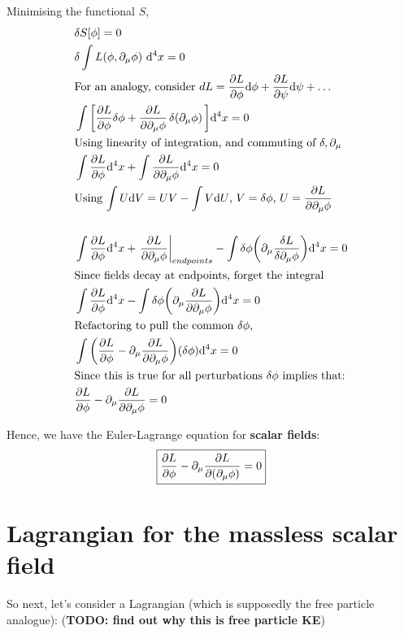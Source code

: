 Minimising the functional $S$,
\begin{align*}
    &\delta S[\phi] = 0 \\
    & \delta \int L(\phi, \partial_\mu \phi)~\dd^4x = 0 \\
    &\text{For an analogy, consider $dL = \pdv{L}{\phi} \dd \phi + \pdv{L}{\psi} \dd \psi + \dots$} \\
    & \int \bigg[\pdv{L}{\phi} \var \phi + 
    \pdv{L}{\partial_\mu \phi} \var (\partial_\mu \phi) \bigg] \dd^4 x  = 0\\
    &\text{Using linearity of integration, and commuting of $\delta, \partial_\mu$}\\
    & \int \pdv{L}{\phi} (\var \phi) \dd^4 x + 
      \int \pdv{L}{\partial_\mu \phi}  (\partial_\mu \var \phi) \dd^4 x = 0 \\
    &\text{Using $\int U \dd V = UV - \int V \dd U$, 
        $V = \delta \phi$, 
    $U = \pdv{L}{\partial_\mu \phi}$ } \\
    \\
    & \int \pdv{L}{\phi} (\var \phi) \dd^4 x + 
       \eval{\pdv{L}{\partial_\mu \phi}  (\var \phi)}_{endpoints} 
      -  \int \delta \phi \bigg(\partial_\mu \fdv{L}{\partial_\mu \phi} \bigg) \dd^4 x  = 0\\
  &\text{Since fields decay at endpoints, forget the integral} \\
  & \int \pdv{L}{\phi} (\var \phi) \dd^4 x  
  -  \int \delta \phi \bigg(\partial_\mu \pdv{L}{\partial_\mu \phi} \bigg) \dd^4 x = 0\\
  &\text{Refactoring to pull the common $\delta \phi$,}\\
  & \int \bigg(\pdv{L}{\phi} -  \partial_\mu \pdv{L}{\partial_\mu \phi} \bigg) (\var \phi) \dd^4 x  = 0 \\
  & \text{Since this is true for all perturbations $\delta \phi$ implies that:} \\
  &\pdv{L}{\phi} -  \partial_\mu \pdv{L}{\partial_\mu \phi} = 0
\end{align*}


Hence, we have the Euler-Lagrange equation for \textbf{scalar fields}:
\begin{equation}
    \boxed{\pdv{L}{\phi} -  \partial_\mu \pdv{L}{(\partial_\mu \phi)} = 0} 
\end{equation}

\section{Lagrangian for the massless scalar field}
So next, let's consider a Lagrangian (which is supposedly the free particle
analogue):
(\textbf{TODO: find out why this is free particle KE})

